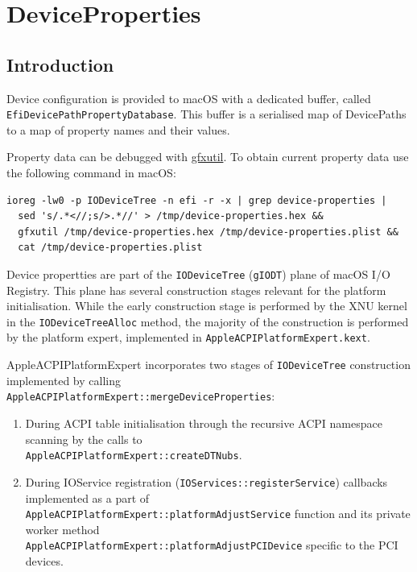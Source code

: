 \documentclass[]{article}
\makeatletter
\providecommand{\tightlist}{%
  \setlength{\itemsep}{0pt}\setlength{\parskip}{0pt}}
\renewcommand{\label}[1]{%
\zref@wrapper@immediate{\oldlabel{#1}}}  %
\makeatother
\begin{document}
\section{DeviceProperties}\label{devprops}

\subsection{Introduction}\label{devpropsintro}

Device configuration is provided to macOS with a dedicated buffer,
called \texttt{EfiDevicePathPropertyDatabase}. This buffer is a serialised
map of DevicePaths to a map of property names and their values.

Property data can be debugged with
\href{https://github.com/acidanthera/gfxutil}{gfxutil}.
To obtain current property data use the following command in macOS:
\begin{lstlisting}[label=gfxutil, style=ocbash]
ioreg -lw0 -p IODeviceTree -n efi -r -x | grep device-properties |
  sed 's/.*<//;s/>.*//' > /tmp/device-properties.hex &&
  gfxutil /tmp/device-properties.hex /tmp/device-properties.plist &&
  cat /tmp/device-properties.plist
\end{lstlisting}

Device propertties are part of the \texttt{IODeviceTree} (\texttt{gIODT})
plane of macOS I/O Registry. This plane has several construction stages
relevant for the platform initialisation. While the early construction
stage is performed by the XNU kernel in the \texttt{IODeviceTreeAlloc}
method, the majority of the construction is performed by the platform expert,
implemented in \texttt{AppleACPIPlatformExpert.kext}.

AppleACPIPlatformExpert incorporates two stages of \texttt{IODeviceTree}
construction implemented by calling \\
\texttt{AppleACPIPlatformExpert::mergeDeviceProperties}:

\begin{enumerate}
  \tightlist
  \item During ACPI table initialisation through the recursive ACPI namespace scanning
  by the calls to \\
  \texttt{AppleACPIPlatformExpert::createDTNubs}.
  \item During IOService registration (\texttt{IOServices::registerService}) callbacks
  implemented as a part of \\
  \texttt{AppleACPIPlatformExpert::platformAdjustService}
  function and its private worker method \\
  \texttt{AppleACPIPlatformExpert::platformAdjustPCIDevice}
  specific to the PCI devices.
\end{enumerate}
\end{document}
